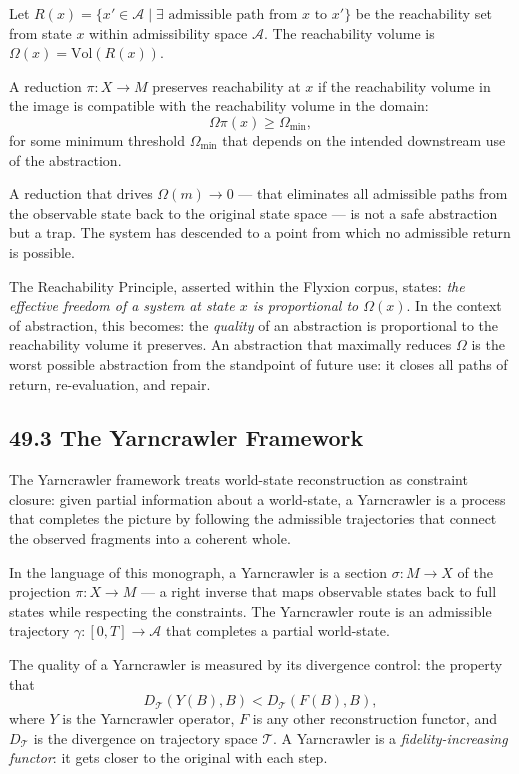 \documentclass[12pt,letterpaper]{article}
\theoremstyle{remark}
\begin{document}
Let $R(x) = \{x' \in \mathcal{A} \mid \exists \text{ admissible
path from } x \text{ to } x'\}$ be the reachability set from
state $x$ within admissibility space $\mathcal{A}$. The
reachability volume is $\Omega(x) = \mathrm{Vol}(R(x))$.

A reduction $\pi: X \to M$ preserves reachability at $x$ if the
reachability volume in the image is compatible with the
reachability volume in the domain:
\[
\Omega\pi(x) \geq \Omega_{\min},
\]
for some minimum threshold $\Omega_{\min}$ that depends on the
intended downstream use of the abstraction.

A reduction that drives $\Omega(m) \to 0$ — that eliminates all
admissible paths from the observable state back to the original
state space — is not a safe abstraction but a trap. The system
has descended to a point from which no admissible return is
possible.

The Reachability Principle, asserted within the Flyxion corpus,
states: \emph{the effective freedom of a system at state $x$ is
proportional to $\Omega(x)$}. In the context of abstraction, this
becomes: the \emph{quality} of an abstraction is proportional to
the reachability volume it preserves. An abstraction that maximally
reduces $\Omega$ is the worst possible abstraction from the
standpoint of future use: it closes all paths of return,
re-evaluation, and repair.

\subsection{49.3 The Yarncrawler Framework}

The Yarncrawler framework treats world-state reconstruction as
constraint closure: given partial information about a world-state,
a Yarncrawler is a process that completes the picture by following
the admissible trajectories that connect the observed fragments
into a coherent whole.

In the language of this monograph, a Yarncrawler is a section
$\sigma: M \to X$ of the projection $\pi: X \to M$ — a right
inverse that maps observable states back to full states while
respecting the constraints. The Yarncrawler route is an admissible
trajectory $\gamma: [0,T] \to \mathcal{A}$ that completes a
partial world-state.

The quality of a Yarncrawler is measured by its divergence
control: the property that
\[
D_\mathcal{T}(Y(B), B) < D_\mathcal{T}(F(B), B),
\]
where $Y$ is the Yarncrawler operator, $F$ is any other
reconstruction functor, and $D_\mathcal{T}$ is the divergence
on trajectory space $\mathcal{T}$. A Yarncrawler is a
\emph{fidelity-increasing functor}: it gets closer to the original
with each step.
\end{document}
